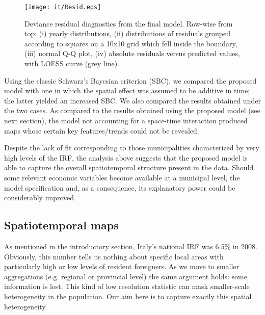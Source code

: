 \begin{figure}[tbp]
	\centering
		\texttt{[image: it/Resid.eps]}
	\caption{Deviance residual diagnostics from the final model. Row-wise from top: (i) yearly distributions, (ii) distributions of residuals grouped according to squares on a 10x10 grid which fell inside the boundary, (iii) normal Q-Q plot, (iv) absolute residuals versus predicted values, with LOESS curve (grey line).}
	\label{Resid}
\end{figure}

Using the classic Schwarz's Bayesian criterion (SBC), we compared the proposed model with one in which the spatial effect was assumed to be additive in time; the latter yielded an increased SBC. We also compared the results obtained under the two cases. As compared to the results obtained using the proposed model (see next section), the model not accounting for a space-time interaction produced maps whose certain key features/trends could not be revealed. 

Despite the lack of fit corresponding to those municipalities characterized by very high levels of the IRF, the analysis above suggests that the proposed model is able to capture the overall spatiotemporal structure present in the data. Should some relevant economic variables become available at a municipal level, the model specification and, as a consequence, its explanatory power could be considerably improved. 

\subsection{Spatiotemporal maps \label{STT}}

As mentioned in the introductory section, Italy's national IRF was 6.5\% in 2008. Obviously, this number tells us nothing about specific local areas with particularly high or low levels of resident foreigners. As we move to smaller aggregations (e.g. regional or provincial level) the same argument holds: some information is lost. This kind of low resolution statistic can mask smaller-scale heterogeneity in the population. Our aim here is to capture exactly this spatial heterogeneity.

